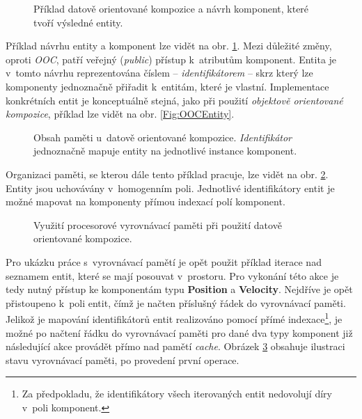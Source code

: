 \begin{figure}[H]
	\centering
	\caption{Příklad datově orientované kompozice a návrh komponent, které tvoří výsledné entity.}
	\label{Fig:DOCHierarchy}
\end{figure}

Příklad návrhu entity a komponent lze vidět na obr. \ref{Fig:DOCHierarchy}. Mezi důležité změny, oproti \emph{OOC}, patří veřejný (\emph{public}) přístup k~atributům komponent. Entita je v~tomto návrhu reprezentována číslem -- \emph{identifikátorem} -- skrz který lze komponenty jednoznačně přiřadit k~entitám, které je vlastní. Implementace konkrétních entit je konceptuálně stejná, jako při použití \emph{objektově orientované kompozice}, příklad lze vidět na obr. \ref{Fig:OOCEntity}.

\begin{figure}[H]
	\centering
	\caption{Obsah paměti u~datově orientované kompozice. \emph{Identifikátor} jednoznačně mapuje entity na jednotlivé instance komponent.}
	\label{Fig:DOCMemory}
\end{figure}

Organizaci paměti, se kterou dále tento příklad pracuje, lze vidět na obr. \ref{Fig:DOCMemory}. Entity jsou uchovávány v~homogenním poli. Jednotlivé identifikátory entit je možné mapovat na komponenty přímou indexací polí komponent.

\begin{figure}[H]
	\centering
	\caption{Využití procesorové vyrovnávací paměti při použití datově orientované kompozice.}
	\label{Fig:DOCCache}
\end{figure}

Pro ukázku práce s~vyrovnávací pamětí je opět použit příklad iterace nad seznamem entit, které se mají posouvat v~prostoru. Pro vykonání této akce je tedy nutný přístup ke komponentám typu \textbf{Position} a \textbf{Velocity}. Nejdříve je opět přistoupeno k~poli entit, čímž je načten příslušný řádek do vyrovnávací paměti. Jelikož je mapování identifikátorů entit realizováno pomocí přímé indexace\footnote{Za předpokladu, že identifikátory všech iterovaných entit nedovolují díry v~poli komponent.}, je možné po načtení řádku do vyrovnávací paměti pro dané dva typy komponent již následující akce provádět přímo nad pamětí \emph{cache}. Obrázek \ref{Fig:DOCCache} obsahuje ilustraci stavu vyrovnávací paměti, po provedení první operace.

